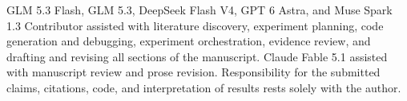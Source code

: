 GLM 5.3 Flash, GLM 5.3, DeepSeek Flash V4, GPT 6 Astra, and Muse Spark 1.3 Contributor assisted with
literature discovery, experiment planning, code generation and debugging,
experiment orchestration, evidence review, and drafting and revising all sections of the
manuscript. Claude Fable 5.1 assisted with manuscript review and prose revision.
Responsibility for the submitted claims, citations, code, and
interpretation of results rests solely with the author.
